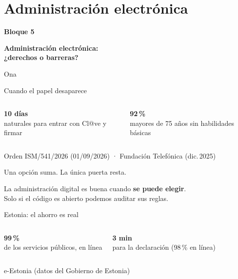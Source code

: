\documentclass[aspectratio=169,12pt]{beamer}
\def\navprev{}
\def\navnext{}
\newcommand{\nav}[2]{\gdef\navprev{#1}\gdef\navnext{#2}}
\newcommand{\cifra}[2]{%
  \begin{center}
    {\color{terra}\fontsize{36}{40}\selectfont\bfseries #1}\\[0.2cm]
    {\large #2}
  \end{center}}
\newcommand{\bloque}[3]{%
  \begin{frame}[plain]
    \vfill
    \begin{center}
      {\color{terra}\large\bfseries Bloque #1}\\[0.3cm]
      {\color{azul}\LARGE\bfseries #2\par}\vspace{0.5cm}
      {\large #3}
    \end{center}
    \vfill
  \end{frame}}
\newcommand{\fuente}[1]{\vfill{\small\color{gris}#1\par}}
\begin{document}
\section{Administración electrónica}
\nav{}{}
\bloque{5}{Administración electrónica:\\¿derechos o barreras?}{Ona}

\nav{}{Tesis}
\begin{frame}{Cuando el papel desaparece}
  \begin{columns}[T]
      \cifra{10 días}{naturales para entrar con Cl@ve y firmar}
      \cifra{92\,\%}{mayores de 75 años sin habilidades básicas}
  \end{columns}
  \fuente{Orden ISM/541/2026 (01/09/2026) · Fundación Telefónica (dic.\,2025)}
\end{frame}

\nav{Sin papel}{Estonia}
\begin{frame}{Una opción suma. La única puerta resta.}
  \vspace{0.5cm}
  \begin{center}
    {\Large La administración digital es buena cuando \alert{\textbf{se puede elegir}}.}\\[0.6cm]
    {\large Solo si el código es abierto podemos auditar sus reglas.}
  \end{center}
\end{frame}

\nav{Tesis}{Doble muro}
\begin{frame}{Estonia: el ahorro es real}
  \begin{columns}[T]
      \cifra{99\,\%}{de los servicios públicos, en línea}
      \cifra{3 min}{para la declaración (98\,\% en línea)}
  \end{columns}
  \fuente{e-Estonia (datos del Gobierno de Estonia)}
\end{frame}
\end{document}
